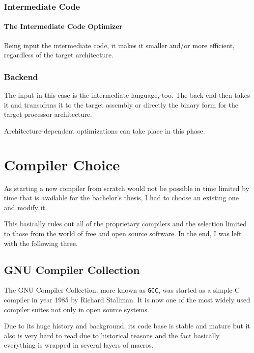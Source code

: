         \subsection{Intermediate Code}

            \subsubsection{The Intermediate Code Optimizer}

                Being input the intermediate code, it makes it smaller and/or more efficient, regardless of the target architecture.

        \subsection{Back\-end}

            The input in this case is the intermediate language, too. The back-end then takes it and transofrms it to the target assembly or directly the binary form for the target processor architecture.

            Architecture-dependent optimizations can take place in this phase.

\chapter{Compiler Choice}\label{compiler}

As starting a new compiler from scratch would not be possible in time limited by time that is available for the bachelor's thesis, I had to choose an existing one and modify it.

This basically rules out all of the proprietary compilers and the selection limited to those from the world of free and open source software. In the end, I was left with the following three.


    \section{GNU Compiler Collection}

    The GNU Compiler Collection, more known as \texttt{GCC}, was started as a simple C compiler in year 1985 by Richard Stallman. It is now one of the most widely used compiler suites not only in open source systems.

    Due to its huge history and background, its code base is stable and mature but it also is very hard to read due to historical reasons and the fact basically everything is wrapped in several layers of macros.

